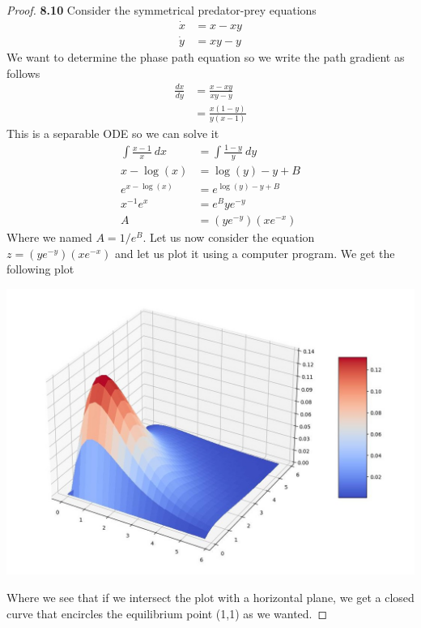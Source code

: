 \documentclass[11pt]{article}
\theoremstyle{definition}
\begin{document}
\cleardoublepage
    \begin{proof}{\textbf{8.10}}
        Consider the symmetrical predator-prey equations
        \begin{align*}
            \dot{x} &= x - xy\\
            \dot{y} &= xy - y
        \end{align*}
        We want to determine the phase path equation so we write the path
        gradient as follows
        \begin{align*}
            \frac{dx}{dy} &= \frac{x - xy}{xy - y}\\
                &= \frac{x(1-y)}{y(x-1)}
        \end{align*}
        This is a separable ODE so we can solve it
        \begin{align*}
            \int \frac{x-1}{x}~dx &= \int \frac{1-y}{y}~dy\\
            x - \log(x) &= \log(y) - y + B\\
            e^{x - \log(x)} &= e^{\log(y) - y + B}\\
            x^{-1}e^x &= e^Bye^{-y}\\
            A &= (ye^{-y})(xe^{-x})
        \end{align*}
        Where we named $A = 1/e^B$.
        Let us now consider the equation $z = (ye^{-y})(xe^{-x})$ and let us
        plot it using a computer program. We get the following plot
        \begin{center}
            \includegraphics[scale=0.3]{ch8-10.jpg}
        \end{center}
        Where we see that if we intersect the plot with a horizontal plane,
        we get a closed curve that encircles the equilibrium point (1,1) as
        we wanted. 
    \end{proof}
\end{document}
